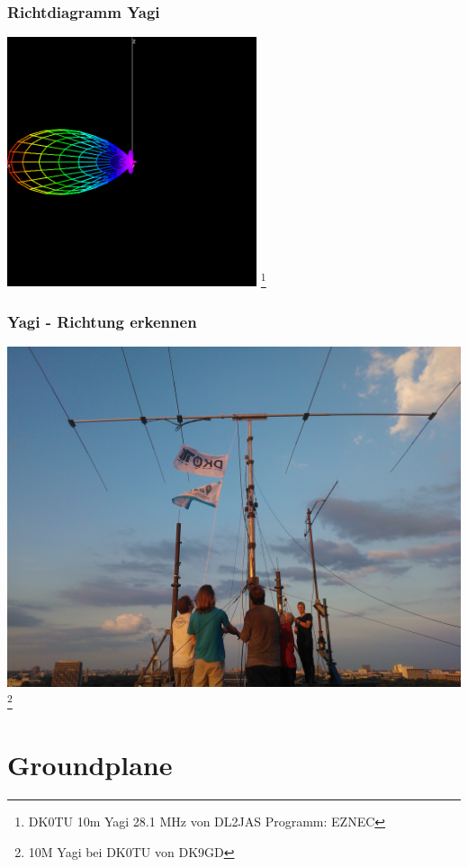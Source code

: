 \begin{frame}
    \frametitle{Richtdiagramm Yagi}
    \begin{center}
        \includegraphics[width=0.55\textwidth]{e11/yagi_gain.png}
        \footnote{\tiny DK0TU 10m Yagi 28.1 MHz von DL2JAS Programm: EZNEC}
	\end{center}
\end{frame}

\begin{frame}
    \frametitle{Yagi - Richtung erkennen}
    \begin{center}
        \includegraphics[width=.75\textwidth]{e11/yagi.jpg}
        \footnote{\tiny 10M Yagi bei DK0TU von DK9GD}
	\end{center}
\end{frame}


\section*{Groundplane}

